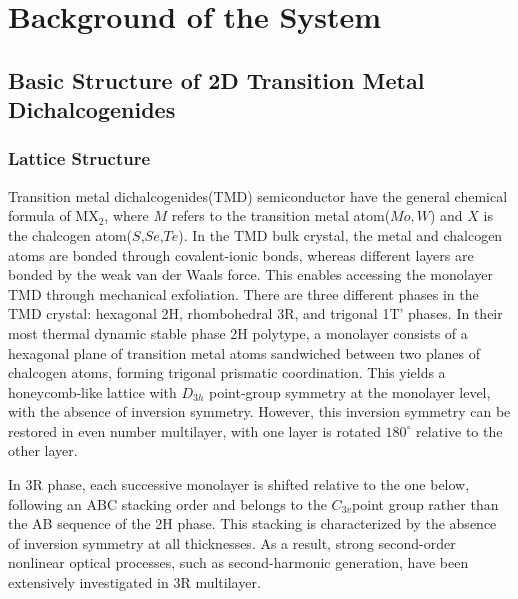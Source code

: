 
\renewcommand{\thechapter}{2}

\chapter{Background of the System}
\label{chap2}

\section{Basic Structure of 2D Transition Metal Dichalcogenides}

\subsection{Lattice Structure}
Transition metal dichalcogenides(TMD) semiconductor have the general chemical formula of MX$_2$, where $M$ refers to the transition metal atom($Mo,W$) and $X$ is the chalcogen atom($S$,$Se$,$Te$).
In the TMD bulk crystal, the metal and chalcogen atoms are bonded through covalent-ionic bonds, whereas different layers are bonded by the weak van der Waals force.
This enables accessing the monolayer TMD through mechanical exfoliation.
There are three different phases in the TMD crystal: hexagonal 2H, rhombohedral 3R, and trigonal 1T' phases. In their most thermal dynamic stable phase 2H polytype, a monolayer consists of a hexagonal plane of transition metal atoms sandwiched between two planes of chalcogen atoms, forming trigonal prismatic coordination.
This yields a honeycomb-like lattice with \textbf{$D_{3h}$} 
point-group symmetry at the monolayer level, with the absence of inversion symmetry. 
However, this inversion symmetry can be restored in even number multilayer, with one layer is rotated $180^\circ$ relative to the other layer.

In 3R phase, each successive monolayer is shifted relative to the one below, following an ABC stacking order and belongs to the \textbf{$C_{3v}$}point group rather than the AB sequence of the 2H phase. 
This stacking is characterized by the absence of inversion symmetry at all thicknesses. 
As a result, strong second-order nonlinear optical processes, such as second-harmonic generation, have been extensively investigated in 3R multilayer\cite{Xu2022-at,Qin2024-xt}.

